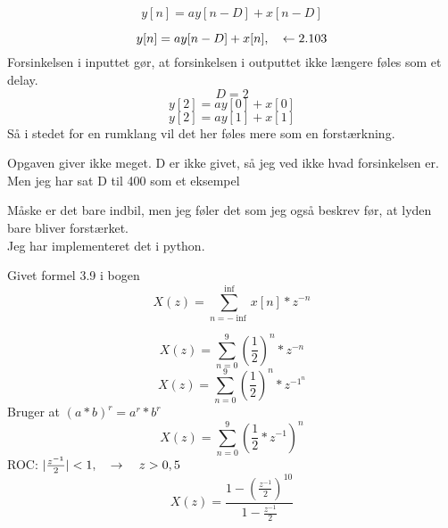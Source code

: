 \begin{Opgaver}
\begin{kapitel}
        \begin{Opgave}
            \[y[n] = ay[n-D] + x[n - D]\]
            \begin{UnderOpgave}
                \[y[n] = ay[n-D] + x[n],\quad \leftarrow 2.103\]
                Forsinkelsen i inputtet gør, at forsinkelsen i outputtet ikke længere føles som et delay. 
                \[D = 2\]
                \[y[2] = ay[0] + x[0]\]
                \[y[2] = ay[1] + x[1]\]\clearpage
                Så i stedet for en rumklang vil det her føles mere som en forstærkning. 
            \end{UnderOpgave}
            \begin{UnderOpgave}\end{UnderOpgave}
            \begin{UnderOpgave}[Beregn og plot for a = 0.7]
                Opgaven giver ikke meget. D er ikke givet, så jeg ved ikke hvad forsinkelsen er. 
                Men jeg har sat D til 400 som et eksempel
            \end{UnderOpgave}
            \begin{UnderOpgave}
                Måske er det bare indbil, men jeg føler det som jeg også beskrev før, at lyden bare bliver forstærket. \\
                Jeg har implementeret det i python.                
            \end{UnderOpgave}
        \end{Opgave}
    \end{kapitel}
    \begin{kapitel}
        \begin{Opgave}
            Givet formel 3.9 i bogen
            \[X(z) = \sum_{n=-\inf}^{\inf}{x[n]*z^{-n}}\]
            \begin{UnderOpgave}[\text{$x[n] = (\frac{1}{2})^n * (u[n] - u[n - 10])$}]
                \[X(z) = \sum_{n=0}^{9}{(\frac{1}{2})^n * z^{-n}}\]
                \[X(z) = \sum_{n=0}^{9}{(\frac{1}{2})^n * z^{-1^{n}}}\]
                Bruger at $(a*b)^r = a^r * b^r$
                \[X(z) = \sum_{n=0}^{9}{(\frac{1}{2} * z^{-1})^n}\]
                ROC: $|\frac{z^{-1}}{2}| < 1,\quad\rightarrow\quad z > 0,5$
                \[X(z) = \frac{1 - (\frac{z^{-1}}{2})^{10}}{1 - \frac{z^{-1}}{2}}\]

\end{UnderOpgave}
\end{Opgave}
\end{kapitel}
\end{Opgaver}
